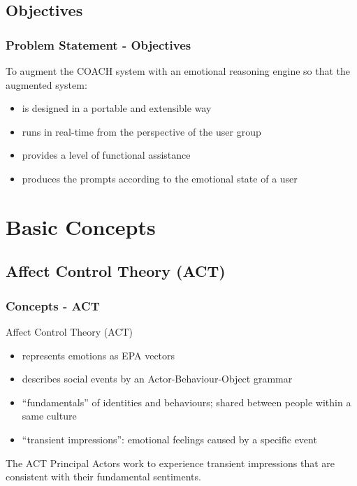 \documentclass{beamer}
\begin{document}
\subsection{Objectives}
\begin{frame}
\frametitle{Problem Statement - Objectives}
To augment the COACH system with an emotional reasoning engine so that the augmented system:\\
\begin{itemize}
\item is designed in a portable and extensible way
\item runs in real-time from the perspective of the user group
\item provides a level of functional assistance
\item produces the prompts according to the emotional state of a user
\end{itemize}
\end{frame}

\section{Basic Concepts}
\subsection{Affect Control Theory (ACT)}
\begin{frame}
\frametitle{Concepts - ACT}
Affect Control Theory (ACT)
\begin{itemize}
\item represents emotions as EPA vectors
\item describes social events by an Actor-Behaviour-Object grammar
\item ``fundamentals'' of identities and behaviours; shared between people within a same culture
\item ``transient impressions'': emotional feelings caused by a specific event
\end{itemize}
\pause
\begin{block}{The ACT Principal}
Actors work to experience transient impressions that are consistent with their fundamental sentiments.
\end{block}
\end{frame}

\end{document}
